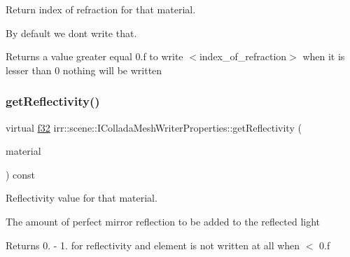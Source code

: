 Return index of refraction for that material. 

By default we don\textquotesingle{}t write that. \begin{DoxyReturn}{Returns}
a value greater equal 0.\+f to write $<$index\+\_\+of\+\_\+refraction$>$ when it is lesser than 0 nothing will be written 
\end{DoxyReturn}
\mbox{\label{classirr_1_1scene_1_1IColladaMeshWriterProperties_ad880b5fc91114049b20347a31199b2a9}} 
\subsubsection{\texorpdfstring{get\+Reflectivity()}{getReflectivity()}\hspace{0.1cm}{\footnotesize\ttfamily [1/2]}}
{\footnotesize\ttfamily virtual \hyperlink{namespaceirr_a0277be98d67dc26ff93b1a6a1d086b07}{f32} irr\+::scene\+::\+I\+Collada\+Mesh\+Writer\+Properties\+::get\+Reflectivity (\begin{DoxyParamCaption}\item[{const \hyperlink{classirr_1_1video_1_1SMaterial}{video\+::\+S\+Material} \&}]{material }\end{DoxyParamCaption}) const\hspace{0.3cm}{\ttfamily [pure virtual]}}



Reflectivity value for that material. 

The amount of perfect mirror reflection to be added to the reflected light \begin{DoxyReturn}{Returns}
0. -\/ 1. for reflectivity and element is not written at all when $<$ 0.\+f 
\end{DoxyReturn}
\mbox{\label{classirr_1_1scene_1_1IColladaMeshWriterProperties_ad880b5fc91114049b20347a31199b2a9}} 
